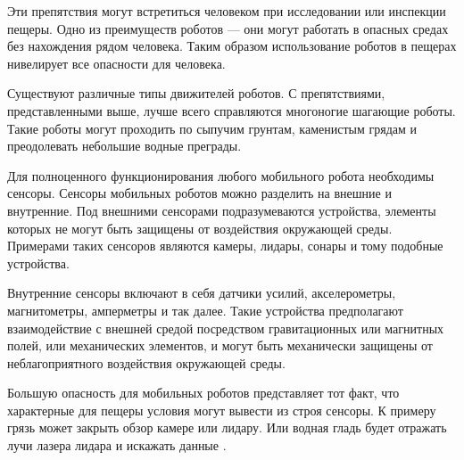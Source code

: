 Эти препятствия могут встретиться человеком при исследовании или инспекции пещеры. Одно из преимуществ роботов --- они могут работать в опасных средах без нахождения рядом человека. Таким образом использование роботов в пещерах нивелирует все опасности для человека.

Существуют различные типы движителей роботов. С препятствиями, представленными выше, лучше всего справляются многоногие шагающие роботы. Такие роботы могут проходить по сыпучим грунтам, каменистым грядам и преодолевать небольшие водные преграды.

Для полноценного функционирования любого мобильного робота необходимы сенсоры. Сенсоры мобильных роботов можно разделить на внешние и внутренние. Под внешними сенсорами подразумеваются устройства, элементы которых не могут быть защищены от воздействия окружающей среды. Примерами таких сенсоров являются камеры, лидары, сонары и тому подобные устройства.

Внутренние сенсоры включают в себя датчики усилий, акселерометры, магнитометры, амперметры и так далее. Такие устройства предполагают взаимодействие с внешней средой посредством гравитационных или магнитных полей, или механических элементов, и могут быть механически защищены от неблагоприятного воздействия окружающей среды.

Большую опасность для мобильных роботов представляет тот факт, что характерные для пещеры условия могут вывести из строя сенсоры. К примеру грязь  может закрыть обзор камере или лидару. Или водная гладь  будет отражать лучи лазера лидара и искажать данные .

